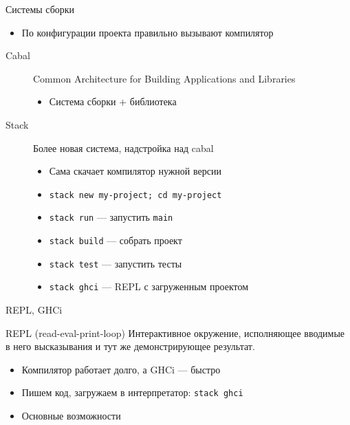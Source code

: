     \begin{frame}{Системы сборки}
        \begin{itemize}
            \item По конфигурации проекта правильно вызывают компилятор
        \end{itemize}
        \begin{description}
            \item[Cabal] Common Architecture for Building Applications and Libraries
            \begin{itemize}
                \item Система сборки + библиотека
            \end{itemize}
            \item[Stack] Более новая система, надстройка над cabal
            \begin{itemize}
                \item Сама скачает компилятор нужной версии
                \item \texttt{stack new my-project; cd my-project}
                \item \texttt{stack run} --- запустить \texttt{main}
                \item \texttt{stack build} --- собрать проект
                \item \texttt{stack test} --- запустить тесты
                \item \texttt{stack ghci} --- REPL с загруженным проектом
            \end{itemize}
        \end{description}
    \end{frame}

    \begin{frame}[fragile]{REPL, GHCi}
        \begin{block}{REPL (read-eval-print-loop)}
            Интерактивное окружение, исполняющее вводимые в него высказывания и тут же демонстрирующее результат.
        \end{block}
        \begin{itemize}
            \item Компилятор работает долго, а GHCi --- быстро
            \item Пишем код, загружаем в интерпретатор: \texttt{stack ghci}
            \item Основные возможности
        \end{itemize}
    \end{frame}

